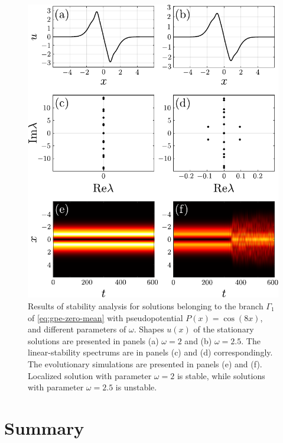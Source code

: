 \pagebreak
\begin{figure}[h]
\centering
	\includegraphics[scale = 1]{pic/stability, zero mean cosine nho}
	\caption{
		Results of stability analysis for solutions belonging to the branch $\Gamma_1$ of \eqref{eq:gpe-zero-mean} with pseudopotential $P(x) = \cos (8 x)$, and different parameters of $\omega$.
		Shapes $u(x)$ of the stationary solutions are presented in panels (a) $\omega = 2$ and (b) $\omega = 2.5$.
		The linear-stability spectrums are in panels (c) and (d) correspondingly.
		The evolutionary simulations are presented in panels (e) and (f).
		Localized solution with parameter $\omega = 2$ is stable, while solutions with parameter $\omega = 2.5$ is unstable.
	}
\label{fig:stability-nho-zero-mean}
\end{figure}
\pagebreak

\section{Summary}

